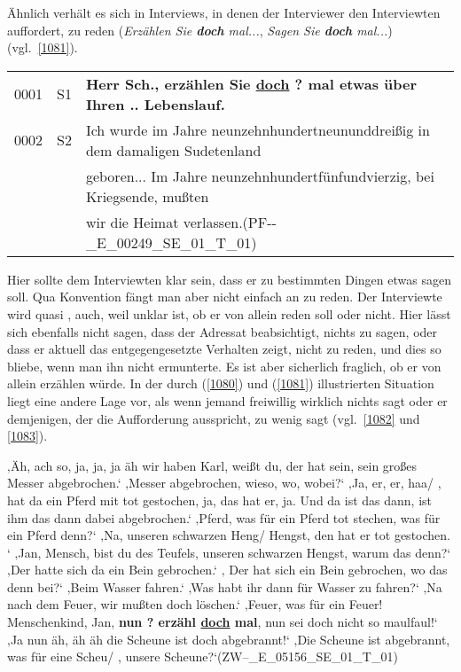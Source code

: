 Ähnlich verhält es sich in Interviews, in denen der Interviewer den Interviewten auffordert, zu reden (\textit{Erzählen Sie \textbf{doch} mal...}, \textit{Sagen Sie \textbf{doch} mal...}) (vgl.\ \ref{1081}).

\begin{exe}
	\ex\label{1081} 

    \begin{tabularx}{\linewidth}[t]{@{}llX@{}}
	0001 & S1 &	\textbf{Herr Sch., erzählen Sie \ul{doch} ? mal etwas über Ihren .. Lebenslauf.}\\
	0002 & S2 & Ich wurde im Jahre neunzehnhundertneununddreißig in dem damaligen Sudetenland \\
	& & geboren... Im Jahre neunzehnhundertfünfundvierzig, bei Kriegsende, mußten \\
	& & wir die Heimat verlassen.\hfill\hbox{(\scshape PF-{}-\_E\_00249\_SE\_01\_T\_01)}
	\end{tabularx}		
\end{exe}
Hier sollte dem Interviewten klar sein, dass er zu bestimmten Dingen etwas sagen soll. Qua Konvention fängt man aber nicht einfach an zu reden. Der Interviewte wird quasi , auch, weil unklar ist, ob er von allein reden soll oder nicht. Hier lässt sich ebenfalls nicht sagen, dass der Adressat beabsichtigt, nichts zu sagen, oder dass er aktuell das entgegengesetzte Verhalten zeigt, nicht zu reden, und dies so bliebe, wenn man ihn nicht ermunterte. Es ist aber sicherlich fraglich, ob er von allein erzählen würde. In der durch (\ref{1080}) und (\ref{1081}) illustrierten Situation liegt eine andere Lage vor, als wenn jemand freiwillig wirklich nichts sagt oder er demjenigen, der die Aufforderung ausspricht, zu wenig sagt (vgl.\ \ref{1082} und \ref{1083}).

\begin{exe}
	\ex\label{1082} 
    ‚Äh, ach so, ja, ja, ja äh wir haben Karl, weißt du, der hat sein, sein großes Messer abgebrochen.‘ ‚Messer abgebrochen, wieso, wo, 			wobei?‘ ‚Ja, er, er, haa/ , hat da ein Pferd mit tot gestochen, ja, das hat er, ja. Und da ist das dann, ist ihm das dann dabei abgebrochen.‘ ‚Pferd, was für ein Pferd tot stechen, was für ein Pferd denn?‘ ‚Na, unseren schwarzen Heng/ Hengst, den hat er tot gestochen.		‘ ‚Jan, Mensch, bist du des Teufels, unseren schwarzen Hengst, warum das denn?‘ ‚Der hatte sich da ein Bein gebrochen.‘ ‚		Der hat sich ein Bein gebrochen, wo das denn bei?‘ ‚Beim Wasser fahren.‘ ‚Was habt ihr dann für Wasser zu fahren?‘ ‚Na 		nach dem Feuer, wir mußten doch löschen.‘ ‚Feuer, was für ein Feuer! Menschenkind, Jan, \textbf{nun ? erzähl \ul{doch} mal}, nun sei 		doch nicht so maulfaul!‘ ‚Ja nun äh, äh äh die Scheune ist doch abgebrannt!‘ ‚Die Scheune ist abgebrannt, was für eine Scheu/ , 		unsere Scheune?‘\hfill\hbox{(\scshape ZW--\_E\_05156\_SE\_01\_T\_01)} 					     
\end{exe}

